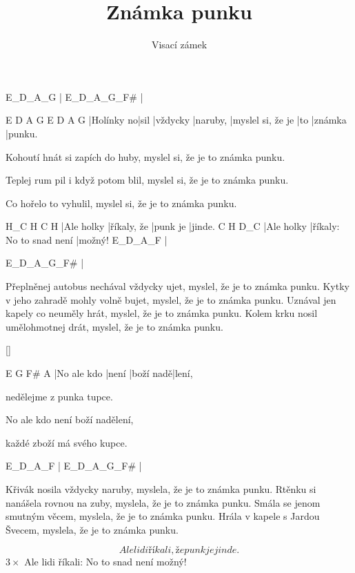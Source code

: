 \documentclass{song}
\title{Známka punku}
\author{Visací zámek}
\begin{document}
\strophe
E_D_A_G
|
E_D_A_G_F#
|
\endstrophe

\strophe
E          D    A        G        E                 D   A       G
|Holínky no|sil |vždycky |naruby, |myslel si, že je |to |známka |punku.

Kohoutí hnát si zapích do huby, myslel si, že je to známka punku.

Teplej rum pil i když potom blil, myslel si, že je to známka punku.

Co hořelo to vyhulil, myslel si, že je to známka punku.
\endstrophe

H_C          H           C        H
|Ale holky |říkaly, že |punk je |jinde.
C          H                        D_C
|Ale holky |říkaly: No to snad není |možný!
E_D_A_F
|
\endstrophe

\strophe
E_D_A_G_F#
|
\endstrophe

\strophe*
Přeplněnej autobus nechával vždycky ujet, myslel, že je to známka punku.
Kytky v jeho zahradě mohly volně bujet, myslel, že je to známka punku.
Uznával jen kapely co neuměly hrát, myslel, že je to známka punku.
Kolem krku nosil umělohmotnej drát, myslel, že je to známka punku.
\endstrophe

\ref{}

\strophe
E           G     F#        A
|No ale kdo |není |boží nadě|lení,

nedělejme z punka tupce.

No ale kdo není boží nadělení,

každé zboží má svého kupce.
\endstrophe

\strophe
E_D_A_F
|
E_D_A_G_F#
|
\endstrophe

\strophe*
Křivák nosila vždycky naruby, myslela, že je to známka punku.
Rtěnku si nanášela rovnou na zuby, myslela, že je to známka punku.
Smála se jenom smutným věcem, myslela, že je to známka punku.
Hrála v kapele s Jardou Švecem, myslela, že je to známka punku.
\endstrophe

\[ Ale lidi říkali, že punk je jinde.\] $3\times$
Ale lidi říkali: No to snad není možný!
\endstrophe
\end{document}
